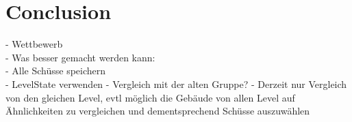 \section{Conclusion}
- Wettbewerb \\
- Was besser gemacht werden kann: \\
	- Alle Schüsse speichern \\
	- LevelState verwenden
	- Vergleich mit der alten Gruppe?
	- Derzeit nur Vergleich von den gleichen Level, evtl möglich die Gebäude von allen Level auf Ähnlichkeiten zu vergleichen und dementsprechend Schüsse auszuwählen